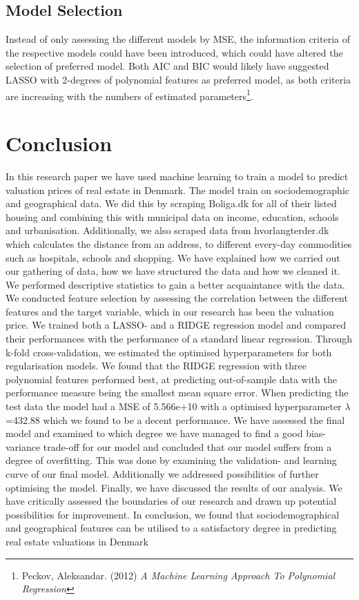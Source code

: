 \documentclass[12pt,a4paper]{article}
\begin{document}
\subsection{Model Selection}
Instead of only assessing the different models by MSE,
the information criteria of the respective models could have been introduced, which could have altered the selection of preferred model. Both AIC and BIC would likely have suggested LASSO with 2-degrees of polynomial features as preferred model, as both criteria are increasing with the numbers of estimated parameters\footnote{Peckov, Aleksandar. (2012)  \textit{A Machine Learning Approach To Polynomial Regression}}. 

\section{Conclusion}
In this research paper we have used machine learning to train a model to predict valuation prices of real estate in Denmark. The model train on sociodemographic and geographical data. \newline We did this by scraping Boliga.dk for all of their listed housing and combining this with municipal data on income, education, schools and urbanisation. Additionally, we also scraped data from hvorlangterder.dk which calculates the distance from an address, to different every-day commodities such as hospitals, schools and shopping. 
We have explained how we carried out our gathering of data, how we have structured the data and how we cleaned it. \newline
We performed descriptive statistics to gain a better acquaintance with the data. 
We conducted feature selection by assessing the correlation between the different features and the target variable, which in our research has been the valuation price. 
We trained both a LASSO- and a RIDGE regression model and compared their performances with the performance of a standard linear regression. Through k-fold cross-validation, we estimated the optimised hyperparameters for both regularisation models. We found that the RIDGE regression with three polynomial features performed best, at predicting out-of-sample data with the performance measure being the smallest mean square error. When predicting the test data the model had a MSE of 5.566e+10 with a optimised hyperparameter $\lambda$=432.88 which we found to be a decent performance. 
We have assessed the final model and examined to which degree we have managed to find a good bias-variance trade-off for our model and concluded that our model suffers from a degree of overfitting. This was done by examining the validation- and learning curve of our final model. Additionally we addressed possibilities of further optimising the model.  \newline
Finally, we have discussed the results of our analysis. We have critically assessed the boundaries of our research and drawn up potential possibilities for improvement. In conclusion, we found that sociodemographical and geographical features can be utilised to a satisfactory degree in predicting real estate valuations in Denmark
\end{document}
